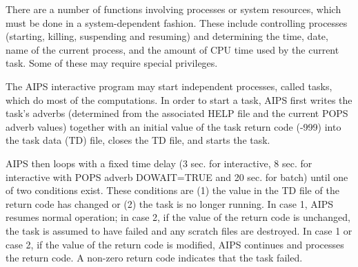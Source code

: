 There are a number of functions involving processes or system
resources, which must be done in a system-dependent fashion.  These
include controlling processes (starting, killing, suspending and
resuming) and determining the time, date, name of the current process,
and the amount of CPU time used by the current task. Some of these may
require special privileges.

The AIPS interactive program may start independent processes, called
tasks, which do most of the computations. In order to start a task,
AIPS first writes the task's adverbs (determined from the associated
HELP file and the current POPS adverb values) together with an initial
value of the task return code (-999) into the task data (TD) file,
closes the TD file, and starts the task.

AIPS then loops with a fixed time delay (3 sec. for interactive, 8
sec. for interactive with POPS adverb DOWAIT=TRUE and 20 sec. for
batch) until one of two conditions exist.  These conditions are (1)
the value in the TD file of the return code has changed or (2) the
task is no longer running.  In case 1, AIPS resumes normal operation;
in case 2, if the value of the return code is unchanged, the task is
assumed to have failed and any scratch files are destroyed.  In case 1
or case 2, if the value of the return code is modified, AIPS continues
and processes the return code.  A non-zero return code indicates that
the task failed.


